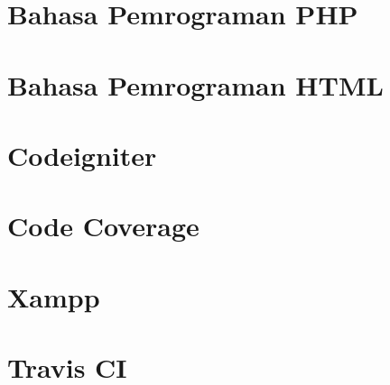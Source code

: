 \section{Bahasa Pemrograman PHP}
\label{php}

\section{Bahasa Pemrograman HTML}
\label{html}

\section{Codeigniter}
\label{ci}

\section{Code Coverage}
\label{codecoverage}

\section{Xampp}
\label{xampp}

\section{Travis CI}
\label{travis}


